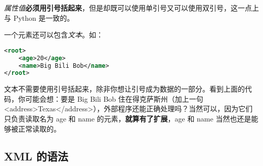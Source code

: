 \emph{属性值}\textbf{必须用引号括起来}，但是却既可以使用单引号又可以使用双引号，这一点上与 Python 是一致的。

一个元素还可以包含\emph{文本}。如：
\begin{lstlisting}[language = xml]
<root>
    <age>20</age>
    <name>Big Bili Bob</name>
</root>
\end{lstlisting}

文本不需要使用引号括起来，除非你想让引号成为数据的一部分。看到上面的代码，你可能会想：要是 Big Bili Bob 住在得克萨斯州（加上一句 <address>Texas</address>），外部程序还能正确处理吗？当然可以，因为它们只负责读取名为 age 和 name 的元素，\textbf{就算有了扩展}，age 和 name 当然也还是能够被正常读取的。

\subsection{XML 的语法\cite{XMLrunoob2}}
